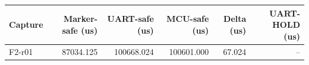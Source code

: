 \begin{tabular}{lrrrrr}
Capture & Marker-safe (us) & UART-safe (us) & MCU-safe (us) & Delta (us) & UART-HOLD (us) \\
\hline
F2-r01 & 87034.125 & 100668.024 & 100601.000 & 67.024 & -- \\
\end{tabular}
